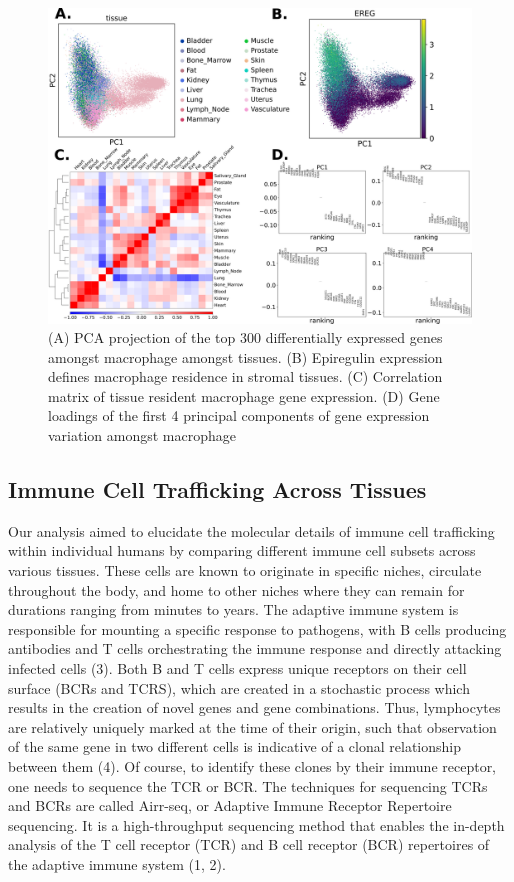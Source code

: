 \begin{figure}[hbt!]
\centering
\includegraphics[width=14cm, keepaspectratio]{figs/paper1/fig1_gex_analysis.png}
\caption[Gene Expreesion Analysis of Tissue Resident Macrophage]{(A) PCA projection of the top 300 differentially expressed genes amongst macrophage amongst tissues. (B) Epiregulin expression defines macrophage residence in stromal tissues. (C) Correlation matrix of tissue resident macrophage gene expression. (D) Gene loadings of the first 4 principal components of gene expression variation amongst macrophage}
\label{fig:paper1_gex}
\end{figure}

\subsection{Immune Cell Trafficking Across Tissues}
Our analysis aimed to elucidate the molecular details of immune cell trafficking within individual humans by comparing different immune cell subsets across various tissues. These cells are known to originate in specific niches, circulate throughout the body, and home to other niches where they can remain for durations ranging from minutes\cite{jerison_heterogeneous_2020} to years\cite{hammarlund_plasma_2017}. The adaptive immune system is responsible for mounting a specific response to pathogens, with B cells producing antibodies and T cells orchestrating the immune response and directly attacking infected cells (3). Both B and T cells express unique receptors on their cell surface (BCRs and TCRS), which are created in a stochastic process which results in the creation of novel genes and gene combinations. Thus, lymphocytes are relatively uniquely marked at the time of their origin, such that observation of the same gene in two different cells is indicative of a clonal relationship between them (4). Of course, to identify these clones by their immune receptor, one needs to sequence the TCR or BCR. The techniques for sequencing TCRs and BCRs are called Airr-seq, or Adaptive Immune Receptor Repertoire sequencing. It is a high-throughput sequencing method that enables the in-depth analysis of the T cell receptor (TCR) and B cell receptor (BCR) repertoires of the adaptive immune system (1, 2). 

